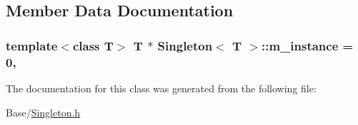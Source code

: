 \subsection{Member Data Documentation}
\hypertarget{class_singleton_a77987e85742da3505825c3195ed7c8a6}{
\subsubsection[{m\-\_\-instance}]{\setlength{\rightskip}{0pt plus 5cm}template$<$class T$>$ T $\ast$ {\bf Singleton}$<$ T $>$\-::m\-\_\-instance = 0\hspace{0.3cm}{\ttfamily [static]}, {\ttfamily [protected]}}}\label{class_singleton_a77987e85742da3505825c3195ed7c8a6}


The documentation for this class was generated from the following file\-:\begin{DoxyCompactItemize}
\item 
Base/\hyperlink{_singleton_8h}{Singleton.\-h}\end{DoxyCompactItemize}

